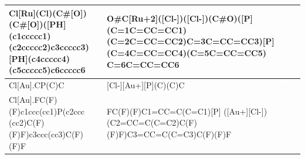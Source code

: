\begin{landscape}
\begin{longtable}{m{7cm}m{8cm}m{2.3cm}m{2.3cm}}
 Cl[Ru](Cl)(C\#[O])(C\#[O])([PH](c1ccccc1) (c2ccccc2)c3ccccc3)[PH](c4ccccc4) (c5ccccc5)c6ccccc6 & 
 O\#C[Ru+2]([Cl-])([Cl-])(C\#O)([P](C=1C=CC=CC1) (C=2C=CC=CC2)C=3C=CC=CC3)[P] (C=4C=CC=CC4)(C=5C=CC=CC5) C=6C=CC=CC6 & 
 \includegraphics[width=2.2cm]{imagenes/sigmaAldrich/Bis(triphenylphosphine)ruthenium(II) dicarbonyl chloride.jpeg} & 
 \includegraphics[width=2.2cm]{imagenes/sciFinder/pdf/Bis(triphenylphosphine)ruthenium(II) dicarbonyl chloride.pdf} \\
\hline

 Cl[Au].CP(C)C & 
 [Cl-][Au+][P](C)(C)C & 
 \includegraphics[width=2.2cm]{imagenes/sigmaAldrich/Chloro(trimethylphosphine)gold(I).png} & 
 \includegraphics[width=2.2cm]{imagenes/sciFinder/pdf/Chloro(trimethylphosphine)gold(I).pdf} \\
\hline


 Cl[Au].FC(F)(F)c1ccc(cc1)P(c2ccc (cc2)C(F)(F)F)c3ccc(cc3)C(F)(F)F & 
 FC(F)(F)C1=CC=C(C=C1)[P] ([Au+][Cl-])(C2=CC=C(C=C2)C(F) (F)F)C3=CC=C(C=C3)C(F)(F)F & 
 \includegraphics[width=2.2cm]{imagenes/sigmaAldrich/Chloro[tris(para-trifluoromethylphenyl)phosphine]gold(I).png} & 
 \includegraphics[width=2.2cm]{imagenes/sciFinder/pdf/Chloro[tris(para-trifluoromethylphenyl)phosphine]gold(I).pdf} \\
\hline




\end{longtable}
\end{landscape}
